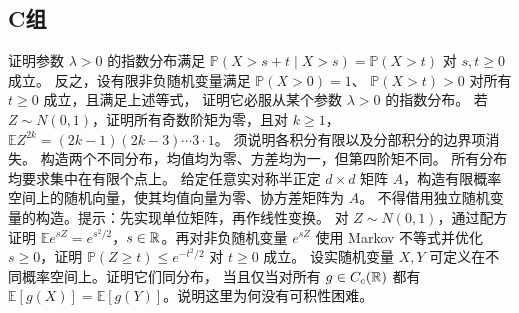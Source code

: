 \subsection*{C组}
\begin{enumerate}[label=\textbf{\thechapter.\arabic*.},resume]
证明参数 \(\lambda>0\) 的指数分布满足
\(\mathbb P(X>s+t\mid X>s)=\mathbb P(X>t)\) 对 \(s,t\ge0\) 成立。
反之，设有限非负随机变量满足 \(\mathbb P(X>0)=1\)、
\(\mathbb P(X>t)>0\) 对所有 \(t\ge0\) 成立，且满足上述等式，
证明它必服从某个参数 \(\lambda>0\) 的指数分布。
若 \(Z\sim N(0,1)\)，证明所有奇数阶矩为零，且对 \(k\ge1\)，
\(\mathbb E Z^{2k}=(2k-1)(2k-3)\cdots3\cdot1\)。
须说明各积分有限以及分部积分的边界项消失。
构造两个不同分布，均值均为零、方差均为一，但第四阶矩不同。
所有分布均要求集中在有限个点上。
给定任意实对称半正定 \(d\times d\) 矩阵 \(A\)，构造有限概率
空间上的随机向量，使其均值向量为零、协方差矩阵为 \(A\)。
不得借用独立随机变量的构造。提示：先实现单位矩阵，再作线性变换。
对 \(Z\sim N(0,1)\)，通过配方证明
\(\mathbb E e^{sZ}=e^{s^2/2}\)，\(s\in\mathbb{R}\)。再对非负随机变量
\(e^{sZ}\) 使用 Markov 不等式并优化 \(s\ge0\)，证明
\(\mathbb P(Z\ge t)\le e^{-t^2/2}\) 对 \(t\ge0\) 成立。
设实随机变量 \(X,Y\) 可定义在不同概率空间上。证明它们同分布，
当且仅当对所有 \(g\in C_c(\mathbb{R})\) 都有
\(\mathbb E[g(X)]=\mathbb E[g(Y)]\)。说明这里为何没有可积性困难。
\end{enumerate}
